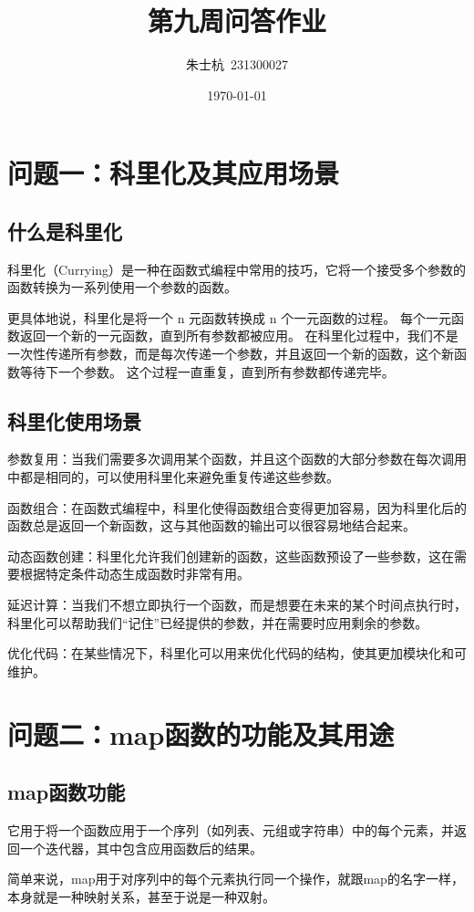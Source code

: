 \documentclass[10pt]{article}
\title{第九周问答作业}
\author{朱士杭\ 231300027}
\date{\kaishu \today}
\begin{document}
	\maketitle
	\section{问题一：科里化及其应用场景}
	\subsection{什么是科里化}
科里化（Currying）是一种在函数式编程中常用的技巧，它将一个接受多个参数的函数转换为一系列使用一个参数的函数。\par
更具体地说，科里化是将一个 n 元函数转换成 n 个一元函数的过程。
每个一元函数返回一个新的一元函数，直到所有参数都被应用。
在科里化过程中，我们不是一次性传递所有参数，而是每次传递一个参数，并且返回一个新的函数，这个新函数等待下一个参数。
这个过程一直重复，直到所有参数都传递完毕。
\subsection{科里化使用场景}
参数复用：当我们需要多次调用某个函数，并且这个函数的大部分参数在每次调用中都是相同的，可以使用科里化来避免重复传递这些参数。\par
函数组合：在函数式编程中，科里化使得函数组合变得更加容易，因为科里化后的函数总是返回一个新函数，这与其他函数的输出可以很容易地结合起来。\par
动态函数创建：科里化允许我们创建新的函数，这些函数预设了一些参数，这在需要根据特定条件动态生成函数时非常有用。\par
延迟计算：当我们不想立即执行一个函数，而是想要在未来的某个时间点执行时，科里化可以帮助我们“记住”已经提供的参数，并在需要时应用剩余的参数。\par
 优化代码：在某些情况下，科里化可以用来优化代码的结构，使其更加模块化和可维护。
\section{问题二：map函数的功能及其用途}
\subsection{map函数功能}
它用于将一个函数应用于一个序列（如列表、元组或字符串）中的每个元素，并返回一个迭代器，其中包含应用函数后的结果。\par
简单来说，map用于对序列中的每个元素执行同一个操作，就跟map的名字一样，本身就是一种映射关系，甚至于说是一种双射。\par
\end{document}
